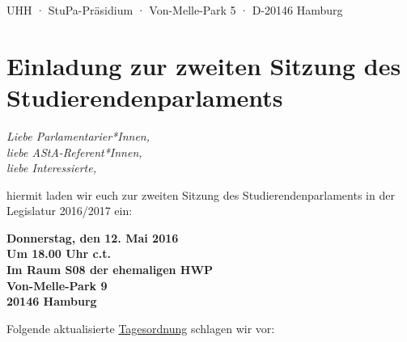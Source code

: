 \documentclass[ngerman,headheight=70pt]{scrartcl}
\begin{document}
    UHH · StuPa-Präsidium · Von-Melle-Park 5 · D-20146 Hamburg

    \section*{Einladung zur zweiten Sitzung des Studierendenparlaments}

    \textit{Liebe Parlamentarier*Innen,\\
    liebe AStA-Referent*Innen,\\
    liebe Interessierte,}

    hiermit laden wir euch zur zweiten Sitzung des Studierendenparlaments
    in der Legislatur 2016/2017 ein:

    \textbf{Donnerstag, den 12. Mai 2016\\
    Um 18.00 Uhr c.t.\\
    Im Raum S08 der ehemaligen HWP\\
    Von-Melle-Park 9\\
    20146 Hamburg}

    Folgende aktualisierte \underline{Tagesordnung} schlagen wir vor:
\end{document}
